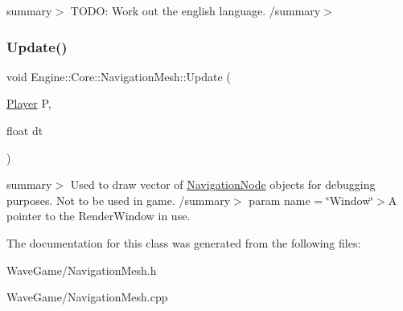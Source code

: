 summary$>$ T\+O\+DO\+: Work out the english language. /summary$>$ \mbox{\label{class_engine_1_1_core_1_1_navigation_mesh_a5f2b7d3b8c7e5ea747f9d8a7c5b432e5}} 
\subsubsection{\texorpdfstring{Update()}{Update()}}
{\footnotesize\ttfamily void Engine\+::\+Core\+::\+Navigation\+Mesh\+::\+Update (\begin{DoxyParamCaption}\item[{\hyperlink{class_engine_1_1_game_play_1_1_player}{Player}}]{P,  }\item[{float}]{dt }\end{DoxyParamCaption})}

summary$>$ Used to draw vector of \hyperlink{struct_engine_1_1_core_1_1_navigation_node}{Navigation\+Node} objects for debugging purposes. Not to be used in game. /summary$>$ param name = \char`\"{}\+Window\char`\"{}$>$A pointer to the Render\+Window in use.

The documentation for this class was generated from the following files\+:\begin{DoxyCompactItemize}
\item 
Wave\+Game/Navigation\+Mesh.\+h\item 
Wave\+Game/Navigation\+Mesh.\+cpp\end{DoxyCompactItemize}
